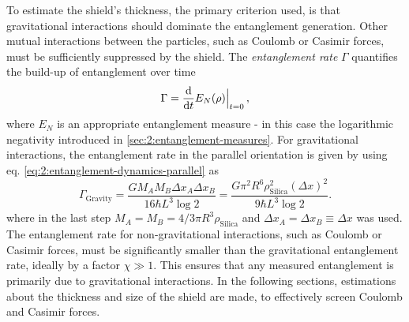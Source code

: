 To estimate the shield's thickness, the primary criterion used, is that gravitational interactions should dominate the entanglement generation.
Other mutual interactions between the particles, such as Coulomb or Casimir forces, must be sufficiently suppressed by the shield.
The \emph{entanglement rate} $\Gamma$ quantifies the build-up of entanglement over time
\begin{equation}\label{eq:5:entanglement-rate}
  \Gamma = \dv{t} E_N(\rho)\Big|_{t=0} \, ,
\end{equation} 
where $E_N$ is an appropriate entanglement measure - in this case the logarithmic negativity \cite{Plenio_2005} introduced in \cref{sec:2:entanglement-measures}.
For gravitational interactions, the entanglement rate in the parallel orientation is given by using eq. \eqref{eq:2:entanglement-dynamics-parallel} as
\begin{equation}\label{eq:5:entanglement-rate-gravity}
  \Gamma_\mathrm{Gravity} = \frac{G M_A M_B \Delta x_A \Delta x_B}{16 \hbar L^3 \log 2} = \frac{G \pi^2 R^6 \rho_\mathrm{Silica}^2 (\Delta x)^2}{9 \hbar L^3 \log 2} .
\end{equation}
where in the last step $M_A = M_B = 4/3 \pi R^3 \rho_\mathrm{Silica}$ and $\Delta x_A = \Delta x_B \equiv \Delta x$ was used.
The entanglement rate for non-gravitational interactions, such as Coulomb or Casimir forces, must be significantly smaller than the gravitational entanglement rate, ideally by a factor $\chi \gg 1$.
This ensures that any measured entanglement is primarily due to gravitational interactions.
In the following sections, estimations about the thickness and size of the shield are made, to effectively screen Coulomb and Casimir forces.


